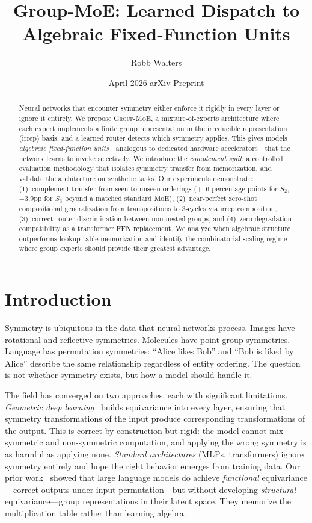 \documentclass[10pt, letterpaper]{article}
\title{Group-MoE: Learned Dispatch to Algebraic Fixed-Function Units}
\author{Robb Walters}
\date{April 2026 \quad\textbar\quad arXiv Preprint}
\newcommand{\gmoe}{\textsc{Group-MoE}}
\begin{document}
\maketitle

\begin{abstract}
Neural networks that encounter symmetry either enforce it rigidly in every layer or ignore it entirely. We propose \gmoe{}, a mixture-of-experts architecture where each expert implements a finite group representation in the irreducible representation (irrep) basis, and a learned router detects which symmetry applies. This gives models \emph{algebraic fixed-function units}---analogous to dedicated hardware accelerators---that the network learns to invoke selectively. We introduce the \emph{complement split}, a controlled evaluation methodology that isolates symmetry transfer from memorization, and validate the architecture on synthetic tasks. Our experiments demonstrate: (1)~complement transfer from seen to unseen orderings (+16 percentage points for $S_2$, +3.9pp for $S_3$ beyond a matched standard MoE), (2)~near-perfect zero-shot compositional generalization from transpositions to 3-cycles via irrep composition, (3)~correct router discrimination between non-nested groups, and (4)~zero-degradation compatibility as a transformer FFN replacement. We analyze when algebraic structure outperforms lookup-table memorization and identify the combinatorial scaling regime where group experts should provide their greatest advantage.
\end{abstract}

\section{Introduction}
\label{sec:intro}

Symmetry is ubiquitous in the data that neural networks process. Images have rotational and reflective symmetries. Molecules have point-group symmetries. Language has permutation symmetries: ``Alice likes Bob'' and ``Bob is liked by Alice'' describe the same relationship regardless of entity ordering. The question is not whether symmetry exists, but how a model should handle it.

The field has converged on two approaches, each with significant limitations. \emph{Geometric deep learning}~\cite{bronstein2021geometric, cohen2016group} builds equivariance into every layer, ensuring that symmetry transformations of the input produce corresponding transformations of the output. This is correct by construction but rigid: the model cannot mix symmetric and non-symmetric computation, and applying the wrong symmetry is as harmful as applying none. \emph{Standard architectures} (MLPs, transformers) ignore symmetry entirely and hope the right behavior emerges from training data. Our prior work~\cite{walters2025ordering} showed that large language models do achieve \emph{functional} equivariance---correct outputs under input permutation---but without developing \emph{structural} equivariance---group representations in their latent space. They memorize the multiplication table rather than learning algebra.
\end{document}
